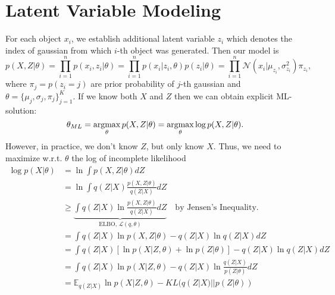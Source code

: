 
\section{Latent Variable Modeling}

For each object $x_i$, we establish additional latent variable $z_i$ which denotes the index of gaussian from which $i$-th object was generated. Then our model is
$$p(X,Z|\theta) = \prod_{i=1}^{n}p(x_i,z_i|\theta) = \prod_{i=1}^{n}p(x_i|z_i,\theta)p(z_i|\theta) = \prod_{i=1}^{n}\mathcal{N}(x_i|\mu_{z_i},\sigma_{z_i}^2)\pi_{z_i},$$
where $\pi_{j} = p(z_i=j)$ are prior probability of $j$-th gaussian and $\theta = \{\mu_j, \sigma_j, \pi_j\}_{j=1}^K$. If we know both $X$ and $Z$ then we can obtain explicit ML-solution:
$$\theta_{ML} = \operatorname*{\operatorname{argmax}}_{\theta}p(X,Z|\theta) = \operatorname*{\operatorname{argmax}}_{\theta}\log p(X,Z|\theta).$$
However, in practice, we don't know $Z$, but only know $X$. Thus, we need to maximize w.r.t. $\theta$ the log of incomplete likelihood
\begin{align}
	\log p(X|\theta) & = \ln \int  p(X, Z|\theta)dZ\\
					 & = \ln\int q(Z|X) \frac{p(X, Z|\theta)}{q(Z|X)}dZ\\
					 & \geq \underbrace{\int q(Z|X) \ln\frac{p(X, Z|\theta)}{q(Z|X)}dZ}_{\textrm{ELBO, } \mathcal{L}(q,\theta)} \quad\textrm{by Jensen's Inequality.}\\
					 &= \int q(Z|X) \ln p(X, Z|\theta) - q(Z|X)\ln q(Z|X)dZ\\
					 &= \int q(Z|X)[\ln p(X|Z,\theta) + \ln p(Z|\theta)]  - q(Z|X)\ln q(Z|X)dZ\\
					 &= \int q(Z|X)\ln p(X|Z,\theta)  - q(Z|X)\ln\frac{q(Z|X)}{p(Z|\theta)}dZ\\
					 &= \mathbb{E}_{q(Z|X)} \ln p(X|Z,\theta)  - KL(q(Z|X)||p(Z|\theta)) 
	\label{eq:elbo}
\end{align}

